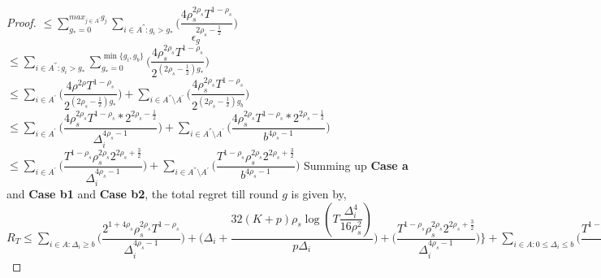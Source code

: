 \begin{proof}
\newline
\hspace*{0em}$\leq\sum_{g_{*}=0}^{max_{j\in A^{'}}g_{j}}\sum_{i\in A^{''}:g_{i}>g_{*}}\bigg(\dfrac{4\rho_{s}^{2\rho_{s}} T^{1-\rho_{s}}}{\epsilon_{g}^{2\rho_{s} - \frac{1}{2}}} \bigg) $
\newline
\hspace*{0em}$\leq\sum_{i\in A^{''}:g_{i}>g_{*}}\sum_{g_{*}=0}^{\min{\lbrace g_{i},g_{b}\rbrace}}\bigg(\dfrac{4\rho_{s}^{2\rho_{s}}T^{1-\rho_{s}}}{2^{({2\rho_{s} - \frac{1}{2}})g_{*}}} \bigg) $
\newline
\hspace*{0em}$\leq\sum_{i\in A^{'}}\bigg(\dfrac{4\rho^{2\rho}T^{1-\rho_{s}}}{2^{({2\rho_{s} - \frac{1}{2}})g_{*}}} \bigg)+\sum_{i\in A^{''}\setminus A^{'}}\bigg(\dfrac{4\rho_{s}^{2\rho_{s}}T^{1-\rho_{s}}}{2^{({2\rho_{s} - \frac{1}{2}})g_{b}}} \bigg)$
\newline
\hspace*{0em}$\leq\sum_{i\in A^{'}}\bigg(\dfrac{4\rho_{s}^{2\rho_{s}}T^{1-\rho_{s}}*2^{2\rho_{s}-\frac{1}{2}}}{\Delta_{i}^{4\rho_{s}-1}} \bigg)+\sum_{i\in A^{''}\setminus A^{'}}\bigg(\dfrac{4\rho_{s}^{2\rho_{s}}T^{1-\rho_{s}}*2^{2\rho_{s}-\frac{1}{2}}}{b^{4\rho_{s}-1}} \bigg)$
\newline
\hspace*{0em}$\leq\sum_{i\in A^{'}}\bigg(\dfrac{T^{1-\rho_{s}}\rho_{s}^{2\rho_{s}}2^{2\rho_{s}+\frac{3}{2}}}{\Delta_{i}^{4\rho_{s}-1}} \bigg)+\sum_{i\in A^{''}\setminus A^{'}}\bigg(\dfrac{T^{1-\rho_{s}}\rho_{s}^{2\rho_{s}}2^{2\rho_{s}+\frac{3}{2}}}{b^{4\rho_{s}-1}} \bigg)$
\newline
Summing up \textbf{Case a} and \textbf{Case b1} and \textbf{Case b2}, the total regret till round $g$ is given by,
\newline $R_{T}\leq \sum_{i\in A:\Delta_{i}\geq b}\bigg(\dfrac{2^{1+4\rho_{s}}\rho_{s}^{2\rho_{s}}T^{1-\rho_{s}}}{\Delta_{i}^{4\rho_{s}-1}}\bigg) + \bigg(\Delta_{i}+\dfrac{32(K+p)\rho_{s}\log{(T\dfrac{\Delta_{i}^{4}}{16\rho_{s}^{2}})}}{p\Delta_{i}}\bigg)  +  \bigg(\dfrac{T^{1-\rho_{s}}\rho_{s}^{2\rho_{s}}2^{2\rho_{s}+\frac{3}{2}}}{\Delta_{i}^{4\rho_{s} -1}} \bigg) \bigg \rbrace+\sum_{i\in A:0\leq\Delta_{i}\leq b}\bigg(\dfrac{T^{1-\rho_{s}}\rho_{s}^{2\rho_{s}}2^{2\rho_{s}+\frac{3}{2}}}{b^{4\rho_{s} -1}} \bigg) + max_{i:\Delta\leq b}\Delta_{i}T$


\end{proof}
